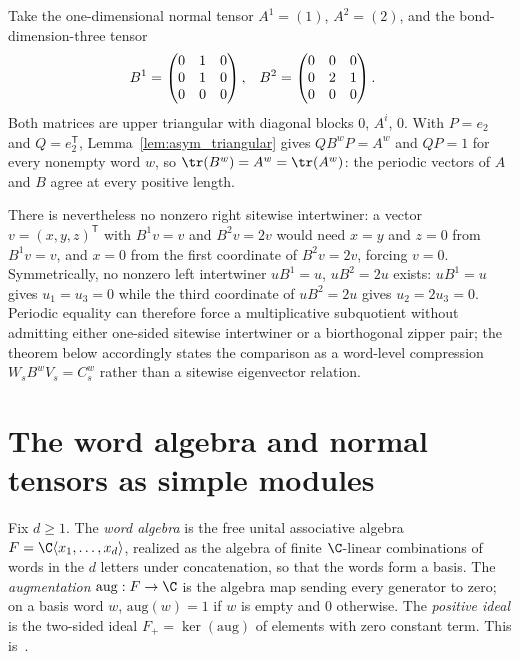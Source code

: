 \begin{remark}
    \label{rem:asym_zipper}
    Take the one-dimensional normal tensor $A^1=(1)$, $A^2=(2)$, and the
    bond-dimension-three tensor
    \begin{align}
        B^1
         & =\begin{pmatrix}0&1&0\\0&1&0\\0&0&0\end{pmatrix},
         &
        B^2
         & =\begin{pmatrix}0&0&0\\0&2&1\\0&0&0\end{pmatrix}.
        \notag
    \end{align}
    Both matrices are upper triangular with diagonal blocks $0$, $A^i$, $0$.
    With $P=e_2$ and $Q=e_2^{\mathsf T}$, Lemma~\ref{lem:asym_triangular}
    gives $QB^wP=A^w$ and $QP=1$ for every nonempty word $w$, so
    $\tr(B^w)=A^w=\tr(A^w)$: the periodic vectors of $A$ and $B$ agree at
    every positive length.

    There is nevertheless no nonzero right sitewise intertwiner: a vector
    $v=(x,y,z)^{\mathsf T}$ with $B^1v=v$ and $B^2v=2v$ would need $x=y$ and
    $z=0$ from $B^1v=v$, and $x=0$ from the first coordinate of
    $B^2v=2v$, forcing $v=0$. Symmetrically, no nonzero left intertwiner
    $uB^1=u$, $uB^2=2u$ exists: $uB^1=u$ gives $u_1=u_3=0$ while
    the third coordinate of $uB^2=2u$ gives $u_2=2u_3=0$. Periodic equality
    can therefore force a multiplicative subquotient without admitting either
    one-sided sitewise intertwiner or a biorthogonal zipper pair; the theorem
    below accordingly states the comparison as a word-level compression
    $W_sB^wV_s=C_s^w$ rather than a sitewise eigenvector relation.
\end{remark}

\section{The word algebra and normal tensors as simple modules}%
\label{sec:asym_word_algebra}

\begin{definition}
    \label{def:asym_word_algebra}
    \leanok
    Fix $d\geq1$. The \emph{word algebra} is the free unital associative
    algebra $F=\C\langle x_1,\ldots,x_d\rangle$, realized as the algebra of
    finite $\C$-linear combinations of words in the $d$ letters under
    concatenation, so that the words form a basis. The \emph{augmentation}
    $\mathrm{aug}:F\to\C$ is the algebra map sending every generator to
    zero; on a basis word $w$, $\mathrm{aug}(w)=1$ if $w$ is empty and $0$
    otherwise. The \emph{positive ideal} is the two-sided ideal
    $F_+=\ker(\mathrm{aug})$ of elements with zero constant term.
    This is~\cite[``Word algebra and positive ideal'']{QICLean2026Blueprint}.
\end{definition}

